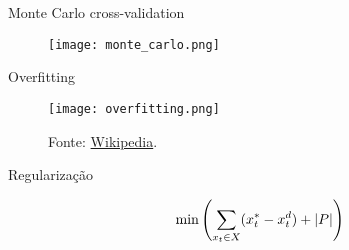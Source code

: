 \begin{frame}{Monte Carlo cross-validation}
  \begin{figure}[t]
    \texttt{[image: monte\_carlo.png]}
    \centering
  \end{figure}
\end{frame}

\begin{frame}{Overfitting}

  \begin{figure}[t]
    \texttt{[image: overfitting.png]}
    \caption{Fonte: \href{https://en.wikipedia.org/wiki/Overfitting}{Wikipedia}.}
    \centering
  \end{figure}

\end{frame}

\begin{frame}{Regularização}

\begin{block}{}
  \[ \min \left(\sum_{x_t \in X} (x^\ast_t - x^d_t) + \lvert P\rvert \right) \]
\end{block}

\end{frame}
